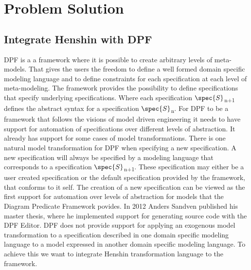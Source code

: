 
\chapter{Problem Solution} %

\label{Chapter5} %


\section{Integrate Henshin with DPF}

DPF is a a framework where it is possible to create arbitrary levels of
meta-models. That gives the users the freedom to define a well formed domain
specific modeling language and to define constraints for each specification at
each level of meta-modeling. The framework provides the possibility to define
specifications that specify underlying specifications. Where each specification
$\spec{S}$\textsubscript{n+1} defines the abstract syntax for a specification
$\spec{S}$\textsubscript{n}. For DPF to be a framework that follows the visions
of model driven engineering it needs to have support for automation of
specifications over different levels of abstraction. It already has support for
some cases of model transformations. There is one natural model transformation
for DPF when specifying a new specification. A new specification will always be
specified by a modeling language that corresponds to a specification
$\spec{S}$\textsubscript{n+1}. These specification may either be a user created
specification or the default specification provided by the framework, that
conforms to it self. The creation of a new specification can be viewed as the
first support for automation over levels of abstraction for models that the
Diagram Predicate Framework povides. In 2012 Anders Sandven published his
master thesis\cite{Sandven_thesis}, where he implemented support for generating
source code with the DPF Editor. DPF does not provide support for applying an
exogenous model transformation to a specification described in one domain
specific modeling language to a model expressed in another domain specific
modeling language. To achieve this we want to integrate Henshin transformation
language\cite{Arendt2010} to the framework. 

